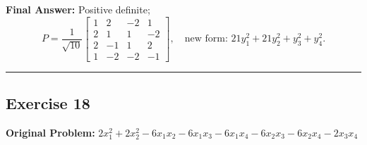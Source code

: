 \documentclass[11pt, letterpaper]{article}
\theoremstyle{definition}
\theoremstyle{remark}
\begin{document}
\textbf{Final Answer:} Positive definite;
\[
P = \frac{1}{\sqrt{10}} \begin{bmatrix} 1 & 2 & -2 & 1 \\ 2 & 1 & 1 & -2 \\ 2 & -1 & 1 & 2 \\ 1 & -2 & -2 & -1 \end{bmatrix}, \quad \text{new form: } 21y_1^2 + 21y_2^2 + y_3^2 + y_4^2.
\]

\medskip\hrule\medskip

\subsection*{Exercise 18}
\textbf{Original Problem:} $2x_1^2 + 2x_2^2 - 6x_1x_2 - 6x_1x_3 - 6x_1x_4 - 6x_2x_3 - 6x_2x_4 - 2x_3x_4$
\end{document}
